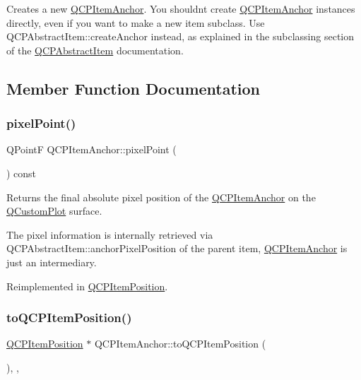 Creates a new \mbox{\hyperlink{class_q_c_p_item_anchor}{Q\+C\+P\+Item\+Anchor}}. You shouldn\textquotesingle{}t create \mbox{\hyperlink{class_q_c_p_item_anchor}{Q\+C\+P\+Item\+Anchor}} instances directly, even if you want to make a new item subclass. Use Q\+C\+P\+Abstract\+Item\+::create\+Anchor instead, as explained in the subclassing section of the \mbox{\hyperlink{class_q_c_p_abstract_item}{Q\+C\+P\+Abstract\+Item}} documentation. 

\subsection{Member Function Documentation}
\mbox{\label{class_q_c_p_item_anchor_ae1a21d9471d1d788624cad297e1b8d6f}} 
\subsubsection{\texorpdfstring{pixel\+Point()}{pixelPoint()}}
{\footnotesize\ttfamily Q\+PointF Q\+C\+P\+Item\+Anchor\+::pixel\+Point (\begin{DoxyParamCaption}{ }\end{DoxyParamCaption}) const\hspace{0.3cm}{\ttfamily [virtual]}}

Returns the final absolute pixel position of the \mbox{\hyperlink{class_q_c_p_item_anchor}{Q\+C\+P\+Item\+Anchor}} on the \mbox{\hyperlink{class_q_custom_plot}{Q\+Custom\+Plot}} surface.

The pixel information is internally retrieved via Q\+C\+P\+Abstract\+Item\+::anchor\+Pixel\+Position of the parent item, \mbox{\hyperlink{class_q_c_p_item_anchor}{Q\+C\+P\+Item\+Anchor}} is just an intermediary. 

Reimplemented in \mbox{\hyperlink{class_q_c_p_item_position_a6cad070c22801295231f5bd6045afe70}{Q\+C\+P\+Item\+Position}}.

\mbox{\label{class_q_c_p_item_anchor_ac54b20120669950255a63587193dbb86}} 
\subsubsection{\texorpdfstring{to\+Q\+C\+P\+Item\+Position()}{toQCPItemPosition()}}
{\footnotesize\ttfamily \mbox{\hyperlink{class_q_c_p_item_position}{Q\+C\+P\+Item\+Position}} $\ast$ Q\+C\+P\+Item\+Anchor\+::to\+Q\+C\+P\+Item\+Position (\begin{DoxyParamCaption}{ }\end{DoxyParamCaption})\hspace{0.3cm}{\ttfamily [inline]}, {\ttfamily [protected]}, {\ttfamily [virtual]}}


